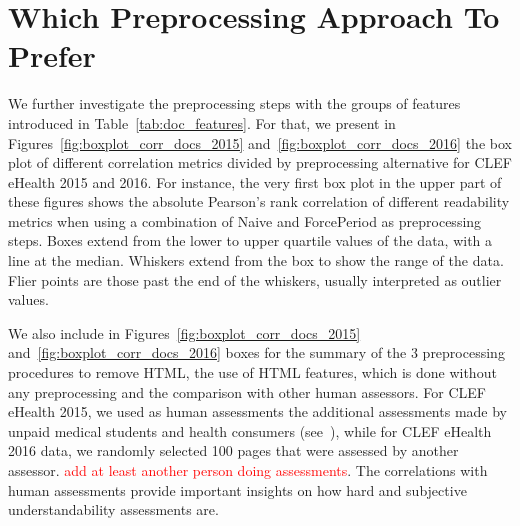 \documentclass[runningheads,a4paper]{llncs}
\newcommand{\mytodo}[1]{\textcolor{red}{#1}}
\begin{document}
\section{Which Preprocessing Approach To Prefer}
\label{sec:which_preprocessing}

We further investigate the preprocessing steps with the groups of features introduced in Table~\ref{tab:doc_features}.
For that, we present in Figures~\ref{fig:boxplot_corr_docs_2015} and~\ref{fig:boxplot_corr_docs_2016} the box plot of different correlation metrics divided by preprocessing alternative for CLEF eHealth 2015 and 2016. 
For instance, the very first box plot in the upper part of these figures shows the absolute Pearson's rank correlation of different readability metrics when using a combination of Naive and ForcePeriod as preprocessing steps.
Boxes extend from the lower to upper quartile values of the data, with a line at the median. Whiskers extend from the box to show the range of the data. Flier points are those past the end of the whiskers, usually interpreted as outlier values.

We also include in Figures~\ref{fig:boxplot_corr_docs_2015} and~\ref{fig:boxplot_corr_docs_2016} boxes for the summary of the 3 preprocessing procedures to remove HTML, the use of HTML features, which is done without any preprocessing and the comparison with other human assessors. For CLEF eHealth 2015, we used as human assessments the additional assessments made by unpaid medical students and health consumers (see~\cite{palotti16b}), while for CLEF eHealth 2016 data, we randomly selected 100 pages that were assessed by another assessor. \mytodo{add at least another person doing assessments}.
The correlations with human assessments provide important insights on how hard and subjective understandability assessments are.
\end{document}
